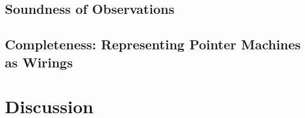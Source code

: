 	\subsection{Soundness of Observations}
	\label{subsec_soundness}
	
	\subsection{Completeness: Representing Pointer Machines as Wirings}
	\label{subsec_completness}
	

\section*{Discussion}


\newpage




